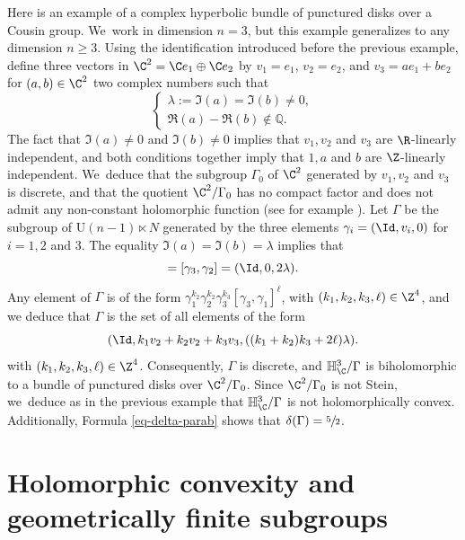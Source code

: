 \begin{example}Here is an example of a complex hyperbolic bundle of punctured disks over a Cousin group. We~work in dimension $n=3$, but this example generalizes to any dimension $n\ge3$. Using the identification introduced before the previous example, define three vectors in $\C^{2}=\C e_1\oplus \C e_2$ by $v_1=e_1$, $v_2=e_2$, and $v_3=ae_1+be_2$ for $(a,b)\in \C^{2}$ two complex numbers such that
\begin{equation*}
\left\{\begin{array}{l}
\lambda:=\Im(a)=\Im(b)\ne 0, \\
\Re(a)-\Re(b) \notin \mathbb{Q}.
\end{array}\right.
\end{equation*}
The fact that $\Im(a)\ne0$ and $\Im(b)\ne0$ implies that $v_1,v_2$ and $v_3$ are $\R$-linearly independent, and both conditions together imply that $1,a$ and $b$ are $\Z$-linearly independent. We~deduce that the subgroup $\Gamma_0$ of $\C^{2}$ generated by $v_1,v_2$ and $v_3$ is discrete, and that the quotient $\C^{2}/\Gamma_0$ has no compact factor and does not admit any non-constant holomorphic function (see for example \cite[pp.\,451-452]{napierConvexityPropertiesCoverings1990}).
Let $\Gamma$ be the subgroup of $\mathrm{U}(n-1)\ltimes N$ generated by the three elements $\gamma_i=(\Id,v_i,0)$ for $i=1,2$ and $3$.
The equality $\Im(a)=\Im(b)=\lambda$ implies that
\begin{equation*}
[\gamma_3,\gamma_1]=[\gamma_3,\gamma_2] = (\Id,0,2\lambda).
\end{equation*}
Any element of $\Gamma$ is of the form $\gamma_1^{k_2}\gamma_2^{k_2}\gamma_3^{k_3}[\gamma_3,\gamma_1]^{\ell}$,
with $(k_1,k_2,k_3,\ell)\in \Z^{4}$, and we deduce that $\Gamma$ is the set of all elements of the form
\begin{equation*}
(\Id,k_1v_2+k_2v_2+k_3v_3,((k_1+k_2)k_3+2\ell)\lambda).
\end{equation*}
with $(k_1,k_2,k_3,\ell)\in \Z^{4}$. Consequently, $\Gamma$ is discrete, and $\mathbb{H}^{3}_{\C}/\Gamma$ is biholomorphic to a bundle of punctured disks over $\C^{2}/\Gamma_0$. Since $\C^{2}/\Gamma_0$ is not Stein, we~deduce as in the previous example that $\mathbb{H}^{3}_{\C}/\Gamma$ is not holomorphically convex. Additionally, Formula \eqref{eq-delta-parab} shows that $\delta(\Gamma)=\sfrac{5}{2}$.
\end{example}

\section{Holomorphic convexity and geometrically finite subgroups}\label{section-hol-cvx-geom-fini}

